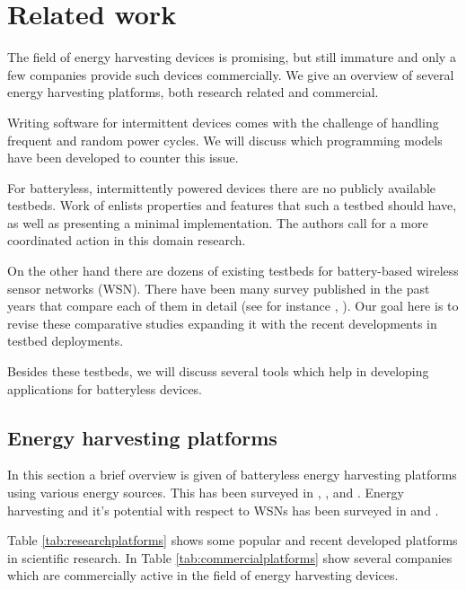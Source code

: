 \chapter{Related work}
\label{chp:related-work}

The field of energy harvesting devices is promising, but still immature and only a few companies provide such devices commercially. We give an overview of several energy harvesting platforms, both research related and commercial.

Writing software for intermittent devices comes with the challenge of handling frequent and random power cycles. We will discuss which programming models have been developed to counter this issue.

For batteryless, intermittently powered devices there are no publicly available testbeds. Work of \cite{request} enlists properties and features that such a testbed should have, as well as presenting a minimal implementation. The authors call for a more coordinated action in this domain research.

On the other hand there are dozens of existing testbeds for battery-based wireless sensor networks (WSN). There have been many survey published in the past years that compare each of them in detail (see for instance \cite{survey1}, \cite{survey2}). Our goal here is to revise these comparative studies expanding it with the recent developments in testbed deployments.

Besides these testbeds, we will discuss several tools which help in developing applications for batteryless devices.

\section{Energy harvesting platforms}

In this section a brief overview is given of batteryless energy harvesting platforms using various energy sources. This has been surveyed in \cite{sudevalayam2011energy}, \cite{energywsn} ,\cite{talla2015powering} and \cite{kim2014ambient}. Energy harvesting and it's potential with respect to WSNs has been surveyed in \cite{akhtar2015energy} and \cite{bhatti2016energy}.

Table \ref{tab:researchplatforms} shows some popular and recent developed platforms in scientific research. In Table \ref{tab:commercialplatforms} show several companies which are commercially active in the field of energy harvesting devices.

